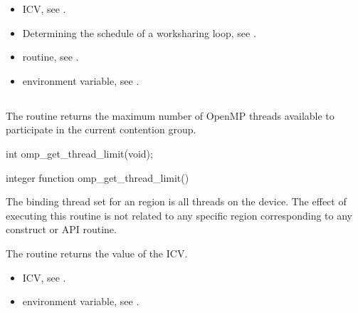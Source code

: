 \crossreferences
\begin{itemize}
\item {} ICV, see 
.

\item Determining the schedule of a worksharing loop, see 
.

\item {} routine, see 
.

\item {} environment variable, see 
.
\end{itemize}









\subsection{}
\label{subsec:omp_get_thread_limit}
\summary
The  routine returns the maximum number of OpenMP 
threads available to participate in the current contention group. 

\format
\ccppspecificstart
\begin{boxedcode}
int omp\_get\_thread\_limit(void);
\end{boxedcode}
\ccppspecificend

\fortranspecificstart
\begin{boxedcode}
integer function omp\_get\_thread\_limit()
\end{boxedcode}
\fortranspecificend

\binding
The binding thread set for an  region is all threads on the 
device. The effect of executing this routine is not related to any specific region 
corresponding to any construct or API routine. 

\effect
The  routine returns the value of the  ICV.

\crossreferences
\begin{itemize}
\item {} ICV, see 
.

\item {} environment variable, see 
.
\end{itemize}









